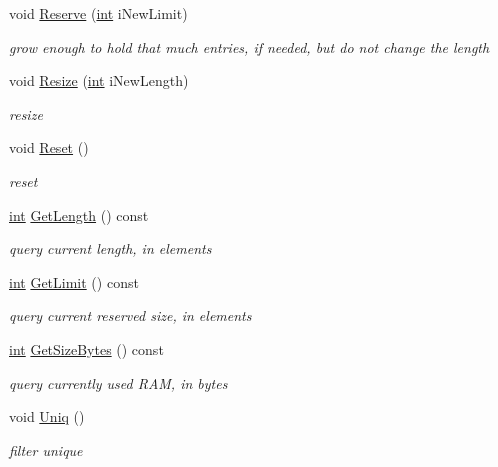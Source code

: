 \begin{DoxyCompactItemize}
void \hyperlink{classCSphVector_a3d7f637de701cc2c0a9bc6ac6ac84f08}{Reserve} (\hyperlink{sphinxexpr_8cpp_a4a26e8f9cb8b736e0c4cbf4d16de985e}{int} i\-New\-Limit)
\begin{DoxyCompactList}\small\item\em grow enough to hold that much entries, if needed, but do {\itshape not} change the length \end{DoxyCompactList}\item 
void \hyperlink{classCSphVector_a3afe88be8f82e370daa83f1490670a59}{Resize} (\hyperlink{sphinxexpr_8cpp_a4a26e8f9cb8b736e0c4cbf4d16de985e}{int} i\-New\-Length)
\begin{DoxyCompactList}\small\item\em resize \end{DoxyCompactList}\item 
void \hyperlink{classCSphVector_acd02e6d673981656c98e5d0d35f585d1}{Reset} ()
\begin{DoxyCompactList}\small\item\em reset \end{DoxyCompactList}\item 
\hyperlink{sphinxexpr_8cpp_a4a26e8f9cb8b736e0c4cbf4d16de985e}{int} \hyperlink{classCSphVector_ab1de94ee40d818fa08e6c6e7f8efb616}{Get\-Length} () const 
\begin{DoxyCompactList}\small\item\em query current length, in elements \end{DoxyCompactList}\item 
\hyperlink{sphinxexpr_8cpp_a4a26e8f9cb8b736e0c4cbf4d16de985e}{int} \hyperlink{classCSphVector_a8b7fe287d3ebbf1ffa474c10743fcec1}{Get\-Limit} () const 
\begin{DoxyCompactList}\small\item\em query current reserved size, in elements \end{DoxyCompactList}\item 
\hyperlink{sphinxexpr_8cpp_a4a26e8f9cb8b736e0c4cbf4d16de985e}{int} \hyperlink{classCSphVector_a4a5f61c8066f8e4032b5c0cc9abc754d}{Get\-Size\-Bytes} () const 
\begin{DoxyCompactList}\small\item\em query currently used R\-A\-M, in bytes \end{DoxyCompactList}\item 
void \hyperlink{classCSphVector_a1ddb1f9b17072c84d8247e6017087895}{Uniq} ()
\begin{DoxyCompactList}\small\item\em filter unique \end{DoxyCompactList}\item 

\end{DoxyCompactItemize}
